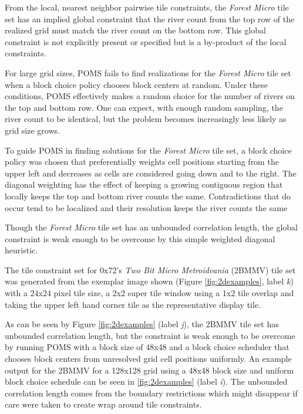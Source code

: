 From the local, nearest neighbor pairwise tile constraints,
the \textit{Forest Micro} tile set has an implied global constraint that the river count from the top row of the realized
grid must match the river count on the bottom row.
This global constraint is not explicitly present or specified but is a by-product of the local constraints.

For large grid sizes, POMS fails to find realizations for the \textit{Forest Micro} tile set when a block
choice policy chooses block centers at random.
Under these conditions, POMS effectively makes a random choice for the number of rivers on the top and bottom row.
One can expect, with enough random sampling, the river count to be identical, but the problem
becomes increasingly less likely as grid size grows.

To guide POMS in finding solutions for the \textit{Forest Micro} tile set, a
block choice policy was chosen that preferentially weights cell positions starting from the upper left and decreases as
cells are considered going down and to the right.
The diagonal weighting has the effect of keeping a growing contiguous region that locally keeps the top and bottom
river counts the same.
Contradictions that do occur tend to be localized and their resolution keeps the river counts the same

Though the \textit{Forest Micro} tile set has an unbounded correlation length, the global constraint is weak enough
to be overcome by this simple weighted diagonal heuristic.

The tile constraint set for 0x72's \textit{Two Bit Micro Metroidvania} (2BMMV) tile set was
generated from the exemplar image shown (Figure \ref{fig:2dexamples}, label \textit{k}) with a 24x24 pixel tile size, a 2x2 super tile window
using a 1x2 tile overlap and taking the upper left hand corner tile as the representative display tile.

As can be seen by Figure \ref{fig:2dexamples} (label \textit{j}), the 2BMMV tile set has unbounded correlation length, but the constraint is weak
enough to be overcome by running POMS with a block size of 48x48 and a block choice scheduler that chooses block centers from
unresolved grid cell positions uniformly.
An example output for the 2BMMV for a 128x128 grid using a 48x48 block size and uniform block choice schedule can be seen in \ref{fig:2dexamples} (label \textit{i}).
The unbounded correlation length comes from the boundary restrictions which might disappear if care were taken
to create wrap around tile constraints.

